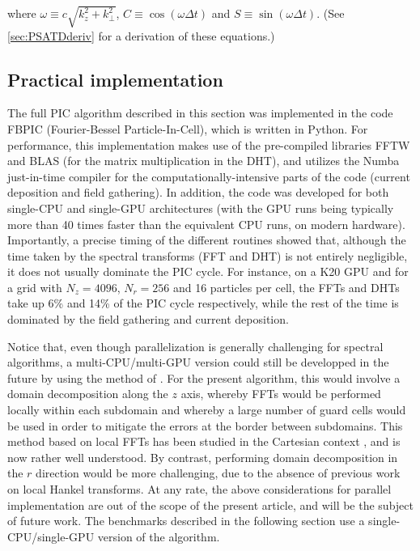\documentclass[1p,times]{elsarticle}
\begin{document}
\noindent where $\omega \equiv c\sqrt{k_z^2 + k_\perp^2}$, $C \equiv \cos(\omega \Delta t)$
and $S \equiv \sin(\omega \Delta t) $. (See \ref{sec:PSATDderiv} for a
derivation of these equations.)

\subsection{Practical implementation}

The full PIC algorithm described in this section was implemented in the
code \textsc{FBPIC} (Fourier-Bessel Particle-In-Cell), which is
written in Python. For performance, this implementation makes use of the
pre-compiled libraries FFTW \cite{FFTW} and BLAS \cite{BLAS} (for the
matrix multiplication in the DHT), and utilizes the Numba just-in-time 
compiler \cite{Numba} for the computationally-intensive parts of the
code (current deposition and field gathering). In addition, the code
was developed for both single-CPU and single-GPU architectures 
(with the GPU runs being typically more than 40 times faster than the 
equivalent CPU runs, on modern hardware). Importantly, a precise
timing of the different routines showed that, although the time taken
by the spectral transforms (FFT and DHT) is not entirely negligible,
it does not usually dominate the PIC cycle. For instance, on a K20
GPU and for a grid with $N_z=4096$, $N_r=256$ and 16 particles per cell, the FFTs 
and DHTs take up 6\% and 14\% of the PIC cycle respectively, while the
rest of the time is dominated by the field gathering and current
deposition.

Notice that, even though parallelization is generally challenging for spectral
algorithms, a multi-CPU/multi-GPU version could still be developped in the
future by using the method of \cite{VayJCP2013}. For the present
algorithm, this would involve a domain decomposition along the $z$
axis, whereby FFTs would be performed locally within each subdomain 
and whereby a large number of guard cells would be used in order to
mitigate the errors at the border between subdomains. This method
based on local FFTs has been studied in the Cartesian
context \cite{Vincenti2015}, and is now rather well understood. By contrast, 
performing domain decomposition in the $r$ direction would be 
more challenging, due to the absence of
previous work on local Hankel transforms. At any rate, the above
considerations for parallel implementation are out of the scope of the present
article, and will be the subject of future work. The benchmarks
described in the following section use a single-CPU/single-GPU version
of the algorithm.
\end{document}
